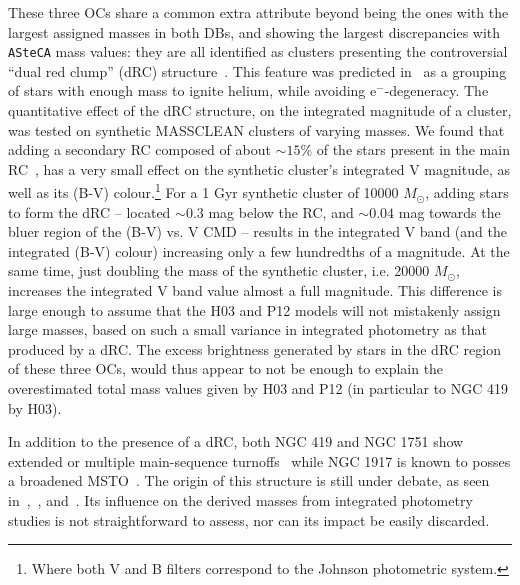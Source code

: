 \documentclass[a4paper,fleqn,usenatbib]{mnras}
\begin{document}
These three OCs share a common extra attribute beyond being the ones with
the largest assigned masses in both DBs, and showing the largest discrepancies
with \texttt{ASteCA} mass values: they are all identified as clusters
presenting the controversial ``dual red clump'' (dRC) structure~\citep
{Girardi_2009}.
This feature was predicted in~\cite{Girardi_1998} as a grouping of stars with
enough mass to ignite helium, while avoiding e$^-$-degeneracy.
%
%
%
The quantitative effect of the dRC structure, on the
integrated magnitude of a cluster, was tested on synthetic MASSCLEAN clusters
of varying masses. We found that adding a secondary RC composed of about
${\sim}15\%$ of the stars present in the main RC~\citep[the approximate value
found for NGC 419 in][]{Girardi_2009}, has a very small effect on the synthetic
cluster's integrated V magnitude, as well as its (B-V) colour.\footnote{Where
both V and B filters correspond to the Johnson photometric system.}
%
For a 1 Gyr synthetic cluster of 10000 $M_{\odot}$, adding stars
to form the dRC -- located ${\sim}0.3$ mag below the RC, and
${\sim}0.04$ mag towards the bluer region of the (B-V) vs. V CMD -- results
in the integrated V band (and the integrated (B-V) colour) increasing only
a few hundredths of a magnitude.
At the same time, just doubling the mass of the synthetic cluster, i.e.
20000 $M_{\odot}$, increases the integrated V band value almost a full
magnitude. This difference is large enough to assume that the H03 and P12
models will not mistakenly assign large masses, based on such a small variance
in integrated photometry as that produced by a dRC.\@
%
The excess brightness generated by stars in the dRC region of these three OCs,
would thus appear to not be enough to explain the overestimated total mass
values given by H03 and P12 (in particular to NGC 419 by H03).

In addition to the presence of a dRC, both NGC 419 and NGC 1751 show
extended or multiple main-sequence turnoffs~\citep[MSTO; see:][]
{Glatt_2008,Milone_2009,Rubele_2010,Rubele_2011,Girardi_2011}
while NGC 1917 is known to posses a broadened MSTO~\citep{Milone_2009}.
The origin of this structure is still under debate, as seen in~\cite
{Piatti_Bastian_2016},~\cite{Milone_2016}, and~\cite{Li_2016}.
Its influence on the derived masses from integrated photometry studies is not
straightforward to assess, nor can its impact be easily discarded.\\
\end{document}
